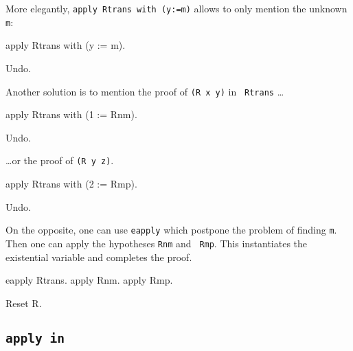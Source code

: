 \begin{coq_example*}
More elegantly, {\tt apply Rtrans with (y:=m)} allows to only mention
the unknown {\tt m}:

\begin{coq_example*}
apply Rtrans with (y := m).
\end{coq_example*}
\begin{coq_eval}
Undo.
\end{coq_eval}

Another solution is to mention the proof of {\tt (R x y)} in {\tt
Rtrans} \ldots

\begin{coq_example}
apply Rtrans with (1 := Rnm).
\end{coq_example}
\begin{coq_eval}
Undo.
\end{coq_eval}

\ldots or the proof of {\tt (R y z)}.

\begin{coq_example}
apply Rtrans with (2 := Rmp).
\end{coq_example}
\begin{coq_eval}
Undo.
\end{coq_eval}

On the opposite, one can use {\tt eapply} which postpone the problem
of finding {\tt m}. Then one can apply the hypotheses {\tt Rnm} and {\tt
Rmp}. This instantiates the existential variable and completes the proof.

\begin{coq_example}
eapply Rtrans.
apply Rnm.
apply Rmp.
\end{coq_example}

\begin{coq_eval}
Reset R.
\end{coq_eval}

\subsection{\tt apply {\term} in {\ident}}


\end{coq_example*}
